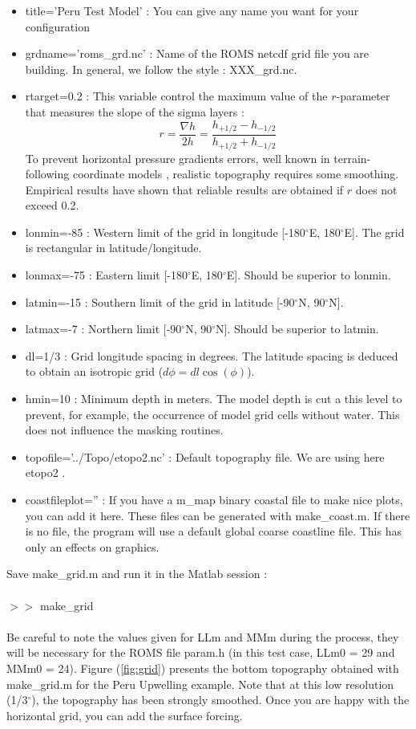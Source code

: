 \begin{itemize}
\item title='Peru Test Model' : You can give any name 
you want for your configuration
\item grdname='roms\_grd.nc' : Name of the ROMS netcdf grid file  you are 
building. In general, we follow the style : XXX\_grd.nc.
\item rtarget=0.2 : This variable control the maximum value of the $r$-parameter
that measures the slope of the sigma layers \citep{Bec93}:
$$
r=\frac{\nabla h}{2h}=\frac{h_{+1/2}-h_{-1/2}}{h_{+1/2}+h_{-1/2}}  
$$
To prevent horizontal pressure gradients errors, well known in
terrain-following coordinate models \citep{Han91}, realistic topography
requires some smoothing. Empirical results have shown that reliable
results are obtained if $r$ does not exceed 0.2.
\item lonmin=-85 : Western limit of the grid in longitude [-180$^\circ$E, 180$^\circ$E]. 
The grid is rectangular in latitude/longitude.
\item lonmax=-75 : Eastern limit [-180$^\circ$E, 180$^\circ$E]. 
Should be superior to lonmin.
\item latmin=-15 : Southern limit of the grid in latitude [-90$^\circ$N, 90$^\circ$N].
\item latmax=-7 : Northern limit [-90$^\circ$N, 90$^\circ$N].
Should be superior to latmin.
\item dl=1/3 : Grid longitude spacing in degrees. The latitude spacing is deduced to
obtain an isotropic grid ($d\phi=dl\cos(\phi)$).
\item hmin=10 : Minimum depth in meters. The model depth is cut a this level 
to prevent, for example, the occurrence of model grid cells without water.
This does not influence the masking routines.
\item topofile='../Topo/etopo2.nc' : Default topography file. We are using 
here etopo2 \citep{Smi97}. 
\item coastfileplot='' : If you have a m\_map binary coastal file to make 
nice plots, you can add it here. These files can be generated with make\_coast.m.
If there is no file, the program will use a default global coarse coastline file.
This has only an effects on graphics. 
\end{itemize}

Save make\_grid.m and run it in the Matlab session :
\\ \\
$>>$ make\_grid
\\ \\
Be careful to note the values given for LLm and MMm during the process,
they will be necessary for the ROMS file param.h (in this test case,
LLm0 = 29 and MMm0 = 24). Figure (\ref{fig:grid}) presents the
bottom topography obtained with make\_grid.m for the
Peru Upwelling example. Note that at this low
resolution (1/3$^\circ$), the topography has been strongly
smoothed.
Once you are happy with the horizontal grid, you 
can add the surface forcing.

